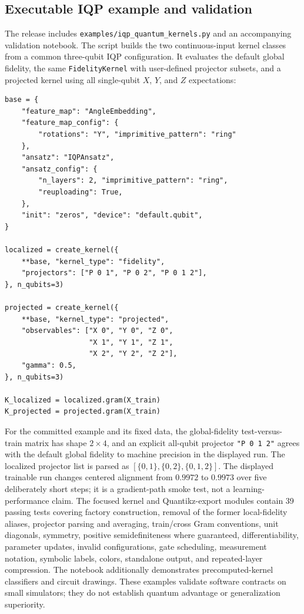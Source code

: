 \documentclass[10pt]{article}
\newcommand{\code}[1]{\texttt{#1}}
\begin{document}
\subsection{Executable IQP example and validation}
\label{sec:kernel-example}

The release includes \code{examples/iqp\_quantum\_kernels.py} and an
accompanying validation notebook.  The script builds the two continuous-input
kernel classes from a common three-qubit IQP configuration.  It evaluates the
default global fidelity, the same \code{FidelityKernel} with user-defined
projector subsets, and a projected kernel using all single-qubit $X$, $Y$, and
$Z$ expectations:

\begin{lstlisting}[caption={Switching the fidelity projector list and the projected-kernel readout without changing the shared IQP circuit configuration.},label={lst:kernel-families}]
base = {
    "feature_map": "AngleEmbedding",
    "feature_map_config": {
        "rotations": "Y", "imprimitive_pattern": "ring"
    },
    "ansatz": "IQPAnsatz",
    "ansatz_config": {
        "n_layers": 2, "imprimitive_pattern": "ring",
        "reuploading": True,
    },
    "init": "zeros", "device": "default.qubit",
}

localized = create_kernel({
    **base, "kernel_type": "fidelity",
    "projectors": ["P 0 1", "P 0 2", "P 0 1 2"],
}, n_qubits=3)

projected = create_kernel({
    **base, "kernel_type": "projected",
    "observables": ["X 0", "Y 0", "Z 0",
                    "X 1", "Y 1", "Z 1",
                    "X 2", "Y 2", "Z 2"],
    "gamma": 0.5,
}, n_qubits=3)

K_localized = localized.gram(X_train)
K_projected = projected.gram(X_train)
\end{lstlisting}

For the committed example and its fixed data, the global-fidelity test-versus-
train matrix has shape $2\times4$, and an explicit all-qubit projector
\code{"P 0 1 2"} agrees with the default global fidelity to machine precision
in the displayed run.  The localized projector list is parsed as
$[\{0,1\},\{0,2\},\{0,1,2\}]$.  The displayed trainable run changes centered
alignment from $0.9972$ to $0.9973$ over five deliberately short steps; it
is a gradient-path smoke test, not a learning-performance claim.  The focused
kernel and Quantikz-export modules contain 39 passing tests covering factory
construction, removal of the former local-fidelity aliases, projector parsing
and averaging, train/cross Gram conventions, unit diagonals, symmetry,
positive semidefiniteness where guaranteed, differentiability, parameter
updates, invalid configurations, gate scheduling, measurement notation,
symbolic labels, colors, standalone output, and repeated-layer compression.
The notebook additionally demonstrates precomputed-kernel classifiers and
circuit drawings.  These examples validate software contracts on small
simulators; they do not establish quantum advantage or generalization
superiority.
\end{document}
